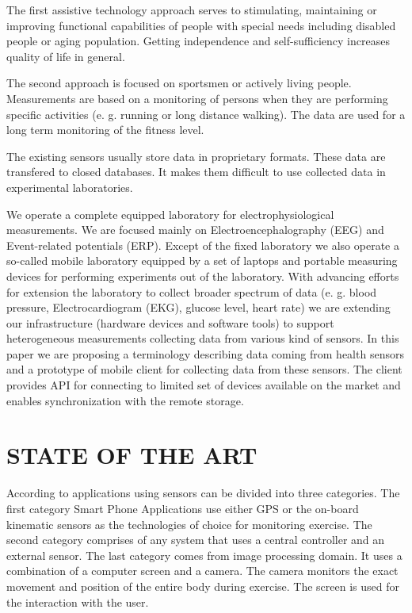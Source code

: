 \documentclass[a4paper,twoside]{article}
\begin{document}
The first assistive technology approach serves to stimulating, maintaining or improving functional capabilities of people with special needs including disabled people or aging population. Getting independence and self-sufficiency increases quality of life in general. 

The second approach is focused on sportsmen or actively living people. Measurements are based on a monitoring of persons when they are performing specific activities (e. g. running or long distance walking). The data are used for a long term monitoring of the fitness level. 

The existing sensors usually store data in proprietary formats. These data are transfered to closed databases. It makes them difficult to use collected data in experimental laboratories. 

We operate a complete equipped laboratory \cite{10.3389/fninf.2014.00020} for electrophysiological measurements. We are focused  mainly on Electroencephalography (EEG) and Event-related potentials (ERP). Except of the fixed laboratory we also operate a so-called mobile laboratory equipped by a set of laptops and portable measuring devices for performing experiments out of the laboratory. With advancing efforts for extension the laboratory to collect broader spectrum of data (e. g. blood pressure, Electrocardiogram (EKG), glucose level, heart rate) we are extending our infrastructure (hardware devices and software tools) to support heterogeneous measurements collecting data from various kind of sensors.  In this paper we are proposing a terminology describing data coming from health sensors and  a prototype of mobile client for collecting data from these sensors. The client provides API for connecting to limited set of devices available on the market and enables synchronization with the remote storage.

\section{\uppercase{state of the art}}
\label{sec:state-of-the-art}

\noindent
According to \cite{Lowe2012242} applications using sensors can be divided into three categories. The first category Smart Phone Applications use either GPS or the
on-board kinematic sensors as the technologies of choice for monitoring exercise. The second category comprises of any system that uses a central controller
and an external sensor. The last category comes from image processing domain. It uses a combination of a computer screen and a camera. The camera monitors the exact movement and position of the entire body during exercise. The screen is used for the interaction with the user.
\end{document}

